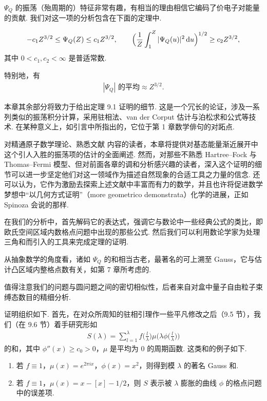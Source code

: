 $\Psi_Q$ 的振荡（殆周期的）特征非常有趣，有相当的理由相信它编码了价电子对能量的贡献. 我们对这一项的分析包含在下面的定理中.

\begin{theorem}\label{thm:9.1}
\begin{align*}
  -c_{1}Z^{3/2}\leq\Psi_{Q}(Z)\leq c_{1}Z^{3/2},\qquad
  \Bigl(\frac{1}{Z}\int_{1}^{Z}|\Psi_{Q}(u)|^{2}\,\mathrm{d}u\Bigr)^{1/2}\geq c_{2}Z^{3/2},
\end{align*}
其中 $0 < c_1, c_2 < \infty$ 是普适常数.
\end{theorem}

特别地，有
\begin{align*}
  |\Psi_{Q}| \text{ 的平均} \approx Z^{3/2}.
\end{align*}

本章其余部分将致力于给出定理 9.1 证明的细节. 这是一个冗长的论证，涉及一系列类似的振荡积分计算，采用驻相法、van der Corput 估计与泊松求和公式等技术. 在某种意义上，如引言中所指出的，它位于第 1 章数学俳句的对跖点.

对精通原子数学理论、熟悉文献 \cite{b208,b209,b218,b221} 内容的读者，本章将提供对基态能量渐近展开中这个引人入胜的振荡项的估计的全面阐述. 然而，对那些不熟悉 Hartree--Fock 与 Thomas--Fermi 模型、但对前面各章的调和分析感兴趣的读者，深入这个证明的细节可以进一步坚定他们对这一领域作为描述自然现象的合适工具之力量的信念. 还可以认为，它作为激励去探索上述文献中丰富而有力的数学，并且也许将促进数学梦想中``以几何方式证明''（more geometrico demonstrata）化学的进展，正如 Spinoza 会说的那样.

在我们的分析中，首先解码它的表达式，强调它与数论中一些经典公式的类比，即欧氏空间区域内数格点问题中出现的那些公式. 然后我们可以利用数论学家为处理三角和而引入的工具来完成定理的证明.

从抽象数学的角度看，诸如 $\Psi_Q$ 的和相当古老，最著名的可上溯至 Gauss，它与估计凸区域内整格点数有关，如第 7 章所考虑的.

值得注意我们的问题与圆问题之间的密切相似性，后者来自对盒中量子自由粒子束缚态数目的精细分析.

证明组织如下. 首先，在对众所周知的驻相引理作一些平凡修改之后（9.5 节），我们（在 9.6 节）着手研究形如
\begin{align*}
  S(\lambda)=\sum_{l=1}^{\lambda}f\Big(\frac{l}{\lambda}\Big)\mu\Big(\lambda\phi\Big(\frac{l}{\lambda}\Big)\Big)
\end{align*}
的和，其中 $\phi''(x) \geq c_0 > 0$，$\mu$ 是平均为 $0$ 的周期函数. 这类和的例子如下.

\begin{enumerate}
\item 若 $f \equiv 1$，$\mu(x) = e^{2\pi ix}$，$\phi(x) = x^2$，则得到模 $\lambda$ 的著名 Gauss 和.
\item 若 $f \equiv 1$，$\mu(x) = x - [x] - 1/2$，则 $S$ 表示被 $\lambda$ 膨胀的曲线 $\phi$ 的格点问题中的误差项.
\end{enumerate}

